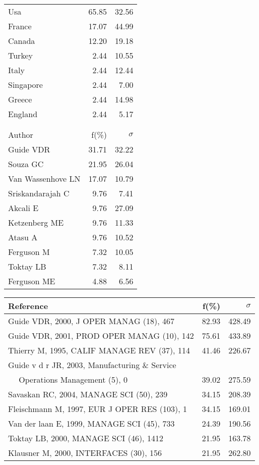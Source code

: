 \documentclass[a4paper,11pt]{report}
\begin{document}
\begin{landscape}
\begin{table}[!ht]
{\begin{tabular}{|l r r|}
\hline
Usa & 65.85 & 32.56\\
France & 17.07 & 44.99\\
Canada & 12.20 & 19.18\\
Turkey & 2.44 & 10.55\\
Italy & 2.44 & 12.44\\
Singapore & 2.44 & 7.00\\
Greece & 2.44 & 14.98\\
England & 2.44 & 5.17\\
 &  & \\
 &  & \\
\hline
\hline
Author & f(\%) & $\sigma$\\
\hline
Guide VDR & 31.71 & 32.22\\
Souza GC & 21.95 & 26.04\\
Van Wassenhove LN & 17.07 & 10.79\\
Sriskandarajah C & 9.76 & 7.41\\
Akcali E & 9.76 & 27.09\\
Ketzenberg ME & 9.76 & 11.33\\
Atasu A & 9.76 & 10.52\\
Ferguson M & 7.32 & 10.05\\
Toktay LB & 7.32 & 8.11\\
Ferguson ME & 4.88 & 6.56\\
\hline
\end{tabular}
}
{\scriptsize\begin{tabular}{|l r r|}
\hline
Reference & f(\%) & $\sigma$\\
\hline
Guide VDR, 2000, J OPER MANAG (18), 467 & 82.93 & 428.49\\
Guide VDR, 2001, PROD OPER MANAG (10), 142 & 75.61 & 433.89\\
Thierry M, 1995, CALIF MANAGE REV (37), 114 & 41.46 & 226.67\\
Guide v d r  JR, 2003, Manufacturing \& Service &  & \\
$\quad$ Operations Management (5), 0 & 39.02 & 275.59\\
Savaskan RC, 2004, MANAGE SCI (50), 239 & 34.15 & 208.39\\
Fleischmann M, 1997, EUR J OPER RES (103), 1 & 34.15 & 169.01\\
Van der laan E, 1999, MANAGE SCI (45), 733 & 24.39 & 190.56\\
Toktay LB, 2000, MANAGE SCI (46), 1412 & 21.95 & 163.78\\
Klausner M, 2000, INTERFACES (30), 156 & 21.95 & 262.80\\

\end{tabular}}
\end{table}
\end{landscape}
\end{document}
